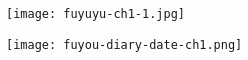 


\begin{figure}[p]
\texttt{[image: fuyuyu-ch1-1.jpg]}
\end{figure}

\begin{graphpaperBox}[enhanced,colframe=diaryborder,top=0mm,left=0mm,boxsep=0mm,width=0.7\textwidth]
\begin{wrapfigure}{l}{0.25\textwidth}
\texttt{[image: fuyou-diary-date-ch1.png]}
\end{wrapfigure}
\hspace{\textheight}
\begin{addmargin}[1em]{0em}

\end{addmargin}

\end{graphpaperBox}
